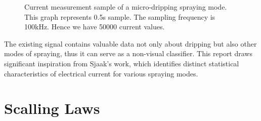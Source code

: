 \begin{figure}[H]
    \centering
    \caption{Current measurement sample of a micro-dripping spraying mode. This graph represents 0.5s sample. The sampling frequency is 100kHz. Hence we have 50000 current values.}
    \label{fig:microdripping_current_pic}
  \end{figure}

  The existing signal contains valuable data not only about dripping but also other modes of spraying, thus it can serve as a non-visual classifier.
  This report draws significant inspiration from Sjaak's\cite{Sjaaks} work, which identifies distinct statistical characteristics of electrical current for various spraying modes.

\section{Scalling Laws}
\label{sec:scalling-laws}



\clearpage